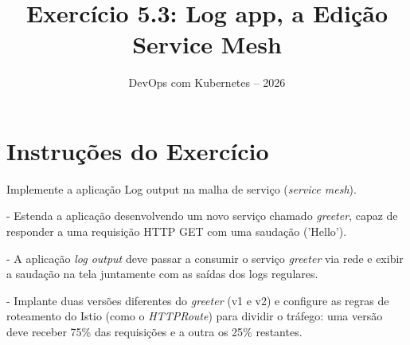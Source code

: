 \documentclass[11pt,a4paper]{article}
\title{\color{secondary}\Huge\textbf{Exercício 5.3: Log app, a Edição Service Mesh}}
\author{\color{primary}DevOps com Kubernetes -- 2026}
\date{}
\begin{document}
\maketitle

\section*{\color{primary}Instruções do Exercício}
\begin{tcolorbox}[colback=blue!5!white,colframe=blue!75!black,title=Exercício 5.3: Log app, a Edição Service Mesh]
Implemente a aplicação Log output na malha de serviço (\textit{service mesh}). 

- Estenda a aplicação desenvolvendo um novo serviço chamado \textit{greeter}, capaz de responder a uma requisição HTTP GET com uma saudação ('Hello').

- A aplicação \textit{log output} deve passar a consumir o serviço \textit{greeter} via rede e exibir a saudação na tela juntamente com as saídas dos logs regulares.

- Implante duas versões diferentes do \textit{greeter} (v1 e v2) e configure as regras de roteamento do Istio (como o \textit{HTTPRoute}) para dividir o tráfego: uma versão deve receber 75\% das requisições e a outra os 25\% restantes.
\end{tcolorbox}
\end{document}
